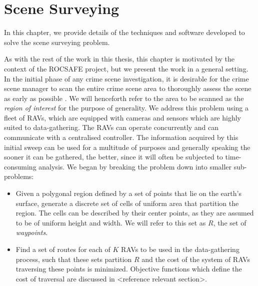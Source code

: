 \chapter{Scene Surveying}\label{chapter:SceneSurveying}
In this chapter, we provide details of the techniques and software developed to solve the scene surveying problem.

As with the rest of the work in this thesis, this chapter is motivated by the context of the ROCSAFE project, but we present the work in a general setting. In the initial phase of any crime scene investigation, it is desirable for the crime scene manager to scan the entire crime scene area to thoroughly assess the scene as early as possible \cite{TechnicalWorkingGrouponCrimeSceneInvestigation2013CrimeEnforcement}. We will henceforth refer to the area to be scanned as the \textit{region of interest} for the purpose of generality. We address this problem using a fleet of RAVs, which are equipped with cameras and sensors which are highly suited to data-gathering. The RAVs can operate concurrently and can communicate with a centralised controller. The information acquired by this initial sweep can be used for a multitude of purposes and generally speaking the sooner it can be gathered, the better, since it will often be subjected to time-consuming analysis. 
We began by breaking the problem down into smaller sub-problems:
\begin{itemize}
    \item Given a polygonal region defined by a set of points that lie on the earth's surface, generate a discrete set of cells of uniform area that partition the region.
    The cells can be described by their center points, as they are assumed to be of uniform height and width. We will refer to this set as $R$, the set of \textit{waypoints}.
    \item Find a set of routes for each of $K$ RAVs to be used in the data-gathering process, such that these sets partition $R$ and the cost of the system of RAVs traversing these points is minimized. Objective functions which define the cost of traversal are discussed in <reference relevant section>.
\end{itemize}

